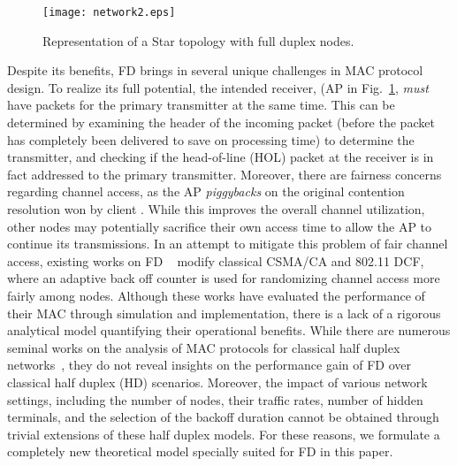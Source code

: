 \documentclass[10pt,journal,cspaper,compsoc]{IEEEtran}
\begin{document}
\begin{figure}[!t]
\centering
\texttt{[image: network2.eps]}
\caption{Representation of a Star topology with full duplex nodes.}
\label{fig:net}
\end{figure}

Despite its benefits, FD brings in several unique challenges in MAC protocol design. To realize its full potential, the intended receiver, (AP in Fig.~\ref{fig:net}, \textit{must} have packets for the primary transmitter  at the same time. This can be determined by examining the header of the incoming packet (before the packet has completely been delivered to save on processing time) to determine the transmitter, and checking if the head-of-line (HOL) packet at the receiver is in fact addressed to the primary transmitter. Moreover, there are fairness concerns regarding channel access, as the AP \textit{piggybacks} on the original contention resolution won by client .  While this improves the overall channel utilization, other nodes may potentially sacrifice their own access time to allow the AP to continue its transmissions. In an attempt to mitigate this problem of fair channel access, existing works on FD ~\cite{MSRFDReport27,Sahai11,Jain11} modify classical CSMA/CA and 802.11 DCF, where an adaptive back off counter is used for randomizing channel access more fairly among nodes. Although these works have evaluated the performance of their MAC through simulation and implementation, there is a lack of a rigorous analytical model quantifying their operational benefits. While there are numerous seminal works on the analysis of MAC protocols for classical half duplex networks~\cite{bianchi,malone07,Wu06,Tsertou08,Hung08,Hung10,Dai13,Gao13,Jang12}, they do not reveal insights on the performance gain of FD over classical half duplex (HD) scenarios. Moreover, the impact of various network settings, including the number of nodes, their traffic rates, number of hidden terminals, and the selection of the backoff duration cannot be obtained through trivial extensions of these half duplex models. For these reasons, we formulate a completely new theoretical model specially suited for FD in this paper.
\end{document}
